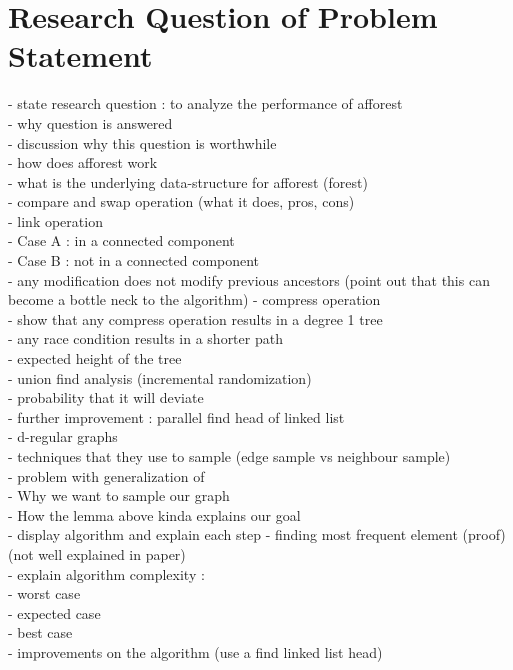 \documentclass[]{article}
\begin{document}
 \section{Research Question of Problem Statement}
 - state research question : to analyze the performance of afforest\\
 - why question is answered\\
 - discussion why this question is worthwhile\\
 - how does afforest work\\
 - what is the underlying data-structure for afforest (forest)\\
 - compare and swap operation (what it does, pros, cons)\\
 - link operation\\
 - Case A : in a connected component\\
 - Case B : not in a connected component\\
 - any modification does not modify previous ancestors (point out that this can\\ become a bottle neck to the algorithm)
 - compress operation\\
 - show that any compress operation results in a degree 1 tree\\
 - any race condition results in a shorter path\\
 - expected height of the tree\\
 - union find analysis (incremental randomization) \\
 - probability that it will deviate \\
 - further improvement : parallel find head of linked list\\
 - d-regular graphs\\
 - techniques that they use to sample (edge sample vs neighbour sample)\\
 - problem with generalization of\\
 - Why we want to sample our graph\\
 - How the lemma above kinda explains our goal\\
 - display algorithm and explain each step
 - finding most frequent element (proof) (not well explained in paper)\\
 - explain algorithm complexity :\\
    - worst case\\
    - expected case\\
    - best case\\
- improvements on the algorithm (use a find linked list head)\\
 
\end{document}
